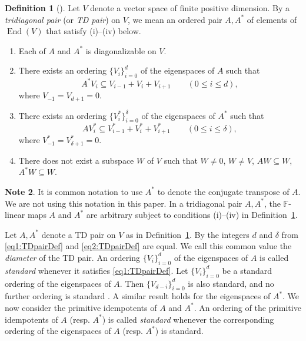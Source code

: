 \documentclass[11pt]{article}%
\theoremstyle{definition}
\newtheorem{definition}{Definition}[section]
\newtheorem{note}[definition]{Note}
\theoremstyle{plain}
\begin{document}
\begin{definition}[{\cite[Definition~1.1]{ITT2001}}]\label{def1}
Let $V$ denote a vector space of finite positive dimension. 
By a \emph{tridiagonal pair} (or \emph{TD pair}) on $V$, we mean an ordered pair $A, A^*$ of elements of $\operatorname{End}(V)$ that satisfy (i)--(iv) below.
\begin{enumerate}[label=(\roman*),font=\rm,itemsep=0mm]
	\item Each of $A$ and $A^*$ is diagonalizable on $V$. 
	\item There exists an ordering $\{ V_i \}_{i=0}^d$ of the eigenspaces of $A$ such that 
	\begin{equation}\label{eq1:TDpairDef}
	A^*V_i \subseteq V_{i-1}+V_i+V_{i+1} \qquad (0 \leq i \leq d),
	\end{equation}
	where $V_{-1}=V_{d+1}=0$. 
	\item There exists an ordering $\{ V^*_i \}_{i=0}^{\delta}$ of the eigenspaces of $A^*$ such that 
	\begin{equation}\label{eq2:TDpairDef}
	AV_i^* \subseteq V^*_{i-1}+V^*_i+V^*_{i+1} \qquad (0 \leq i \leq \delta),
	\end{equation}
	where $V^*_{-1}=V^*_{\delta+1}=0$. 
	\item There does not exist a subspace $W$ of $V$ such that $W \ne 0$, $W \ne V$, $A W \subseteq W$, $A^* W \subseteq W$. 
\end{enumerate}
\end{definition} 

\begin{note}\label{note:A*}
It is common notation to use $A^*$ to denote the conjugate transpose of $A$.  
We are not using this notation in this paper.  
In a tridiagonal pair $A, A^*$, the $\mathbb{F}$-linear maps $A$ and $A^*$ are arbitrary subject to conditions (i)–(iv) in Definition~\ref{def1}.
\end{note}

Let  $A, A^*$ denote a TD pair on $V$ as in Definition~\ref{def1}.  
By \cite[Lemma 4.5]{ITT2001} the integers $d$ and $\delta$ from \eqref{eq1:TDpairDef} and \eqref{eq2:TDpairDef} are equal. 
We call this common value the \emph{diameter} of the TD pair. 
An ordering $\{V_i\}_{i=0}^d$ of the eigenspaces of $A$ is called \emph{standard} whenever it satisfies \eqref{eq1:TDpairDef}.
Let $\{V_i\}_{i=0}^d$ be a standard ordering of the eigenspaces of $A$.
Then $\{V_{d-i}\}_{i=0}^d$ is also standard, and no further ordering is standard \cite[Lemma 2.4]{ITT2001}.
A similar result holds for the eigenspaces of $A^*$.
We now consider the primitive idempotents of $A$ and $A^*$.
An ordering of the primitive idempotents of $A$ (resp. $A^*$) is called \emph{standard} whenever the corresponding ordering of the eigenspaces of $A$ (resp. $A^*$) is standard.
\end{document}
